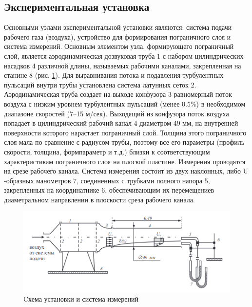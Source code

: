 \documentclass[12pt,a4paper]{article}
\begin{document}
\subsection*{Экспериментальная установка}
Основными узлами экспериментальной установки являются: система подачи рабочего газа (воздуха), устройство для формирования пограничного слоя и система измерений. Основным элементом узла, формирующего пограничный слой, является аэродинамическая дозвуковая труба 1 с набором цилиндрических насадков 4 различной длины, называемых рабочими каналами, закрепленная на станине 8 (рис. \ref{pic6}). Для выравнивания потока и подавления турбулентных пульсаций внутри трубы установлена система латунных сеток 2. Аэродинамическая труба создает на выходе конфузора 3 равномерный поток воздуха с низким уровнем турбулентных пульсаций (менее 0.5$\%$) в необходимом диапазоне скоростей (7–15 м/сек). Выходящий из конфузора поток воздуха попадает в цилиндрический рабочий канал 4 диаметром 49 мм, на внутренней поверхности которого нарастает пограничный слой. Толщина этого пограничного слоя мала по сравнение с радиусом трубы, поэтому все его параметры (профиль скорости, толщина, формпараметр и т.д.) близки к соответствующим характеристикам пограничного слоя на плоской пластине. Измерения проводятся на срезе рабочего канала. Система измерения состоит из двух наклонных, либо U -образных манометров 7, соединенных с трубками полного напора 5, закрепленных на координатнике 6, обеспечивающим их перемещениев диаметральном направлении в плоскости среза рабочего канала.
\begin{figure}[h!]
    \centering
    \includegraphics[width = 1.0 \textwidth]{6.png}
    \caption{Cхема установки и система измерений}
    \label{pic6}
\end{figure}
\end{document}
